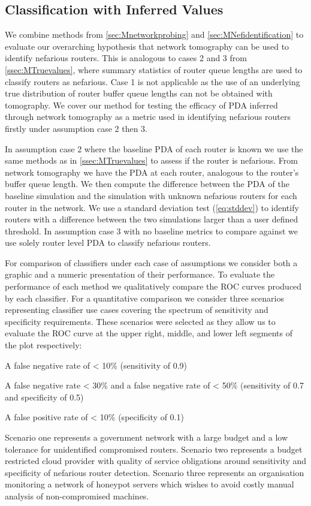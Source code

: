   \subsection{Classification with Inferred Values}
  \label{ssec:MInferredvalues}
  We combine methods from \cref{sec:Mnetworkprobing} and \cref{sec:MNefidentification} to evaluate our overarching hypothesis that network tomography can be used to identify nefarious routers. This is analogous to cases 2 and 3 from \cref{ssec:MTruevalues}, where summary statistics of router queue lengths are used to classify routers as nefarious. Case 1 is not applicable as the use of an underlying true distribution of router buffer queue lengths can not be obtained with tomography. We cover our method for testing the efficacy of PDA inferred through network tomography as a metric used in identifying nefarious routers firstly under assumption case 2 then 3.\par
  In assumption case 2 where the baseline PDA of each router is known we use the same methods as in \cref{ssec:MTruevalues} to assess if the router is nefarious. From network tomography we have the PDA at each router, analogous to the router's buffer queue length. We then compute the difference between the PDA of the baseline simulation and the simulation with unknown nefarious routers for each router in the network. We use a standard deviation test (\cref{eq:stddev}) to identify routers with a difference between the two simulations larger than a user defined threshold. In assumption case 3 with no baseline metrics to compare against we use solely router level PDA to classify nefarious routers.\par
  For comparison of classifiers under each case of assumptions we consider both a graphic and a numeric presentation of their performance. To evaluate the performance of each method we qualitatively compare the ROC curves produced by each classifier. For a quantitative comparison we consider three scenarios representing classifier use cases covering the spectrum of sensitivity and specificity requirements. These scenarios were selected as they allow us to evaluate the ROC curve at the upper right, middle, and lower left segments of the plot respectively: 
    \begin{description}[labelindent=1cm]
      \item[Scenario 1:] A false negative rate of < 10\% (sensitivity of 0.9)
      \item[Scenario 2:] A false negative rate < 30\%  and a false negative rate of < 50\% (sensitivity of 0.7 and specificity of 0.5)
      \item[Scenario 3:] A false positive rate of < 10\% (specificity of 0.1)
  \end{description}
  Scenario one represents a government network with a large budget and a low tolerance for unidentified compromised routers. Scenario two represents a budget restricted cloud provider with quality of service obligations around sensitivity and specificity of nefarious router detection. Scenario three represents an organisation monitoring a network of honeypot servers which wishes to avoid costly manual analysis of non-compromised machines.


